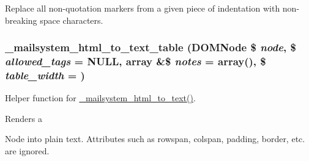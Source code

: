 Replace all non-\/quotation markers from a given piece of indentation with non-\/breaking space characters. \hypertarget{html__to__text_8inc_aaae86eca3d53d44fb34d4a64db93ae89}{
\subsubsection[{\_\-mailsystem\_\-html\_\-to\_\-text\_\-table}]{\setlength{\rightskip}{0pt plus 5cm}\_\-mailsystem\_\-html\_\-to\_\-text\_\-table (DOMNode \$ {\em node}, \/  \$ {\em allowed\_\-tags} = {\ttfamily NULL}, \/  array \&\$ {\em notes} = {\ttfamily array()}, \/  \$ {\em table\_\-width} = {})}}
\label{html__to__text_8inc_aaae86eca3d53d44fb34d4a64db93ae89}
Helper function for \hyperlink{html__to__text_8inc_af581a74a8de0f0cbedc673623bccdc5d}{\_\-mailsystem\_\-html\_\-to\_\-text()}.

Renders a \begin{TabularC}{0}
\hline
\end{TabularC}
Node into plain text. Attributes such as rowspan, colspan, padding, border, etc. are ignored.


